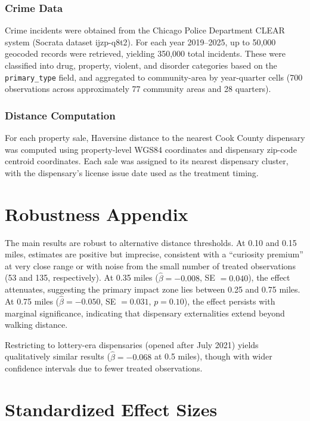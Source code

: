 \documentclass[12pt]{article}
\begin{document}
\subsubsection*{Crime Data} Crime incidents were obtained from the Chicago Police Department CLEAR system (Socrata dataset ijzp-q8t2). For each year 2019--2025, up to 50,000 geocoded records were retrieved, yielding 350,000 total incidents. These were classified into drug, property, violent, and disorder categories based on the \texttt{primary\_type} field, and aggregated to community-area by year-quarter cells (700 observations across approximately 77 community areas and 28 quarters).

\subsubsection*{Distance Computation} For each property sale, Haversine distance to the nearest Cook County dispensary was computed using property-level WGS84 coordinates and dispensary zip-code centroid coordinates. Each sale was assigned to its nearest dispensary cluster, with the dispensary's license issue date used as the treatment timing.

\section{Robustness Appendix}
\label{sec:robust_appendix}

The main results are robust to alternative distance thresholds. At 0.10 and 0.15 miles, estimates are positive but imprecise, consistent with a ``curiosity premium'' at very close range or with noise from the small number of treated observations (53 and 135, respectively). At 0.35 miles ($\hat{\beta} = -0.008$, SE $= 0.040$), the effect attenuates, suggesting the primary impact zone lies between 0.25 and 0.75 miles. At 0.75 miles ($\hat{\beta} = -0.050$, SE $= 0.031$, $p = 0.10$), the effect persists with marginal significance, indicating that dispensary externalities extend beyond walking distance.

Restricting to lottery-era dispensaries (opened after July 2021) yields qualitatively similar results ($\hat{\beta} = -0.068$ at 0.5 miles), though with wider confidence intervals due to fewer treated observations.

\section{Standardized Effect Sizes}
\label{sec:sde}


\end{document}
